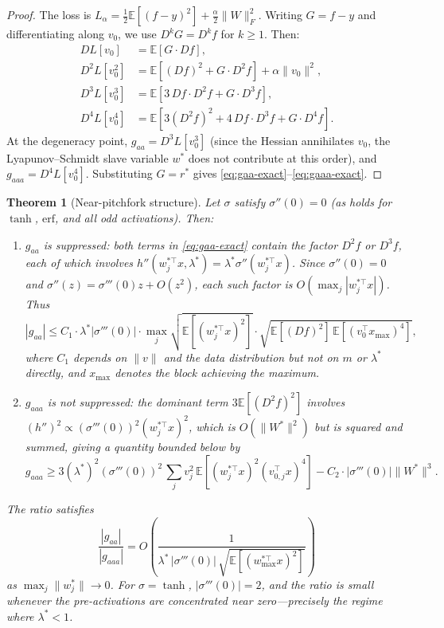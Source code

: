 \documentclass[11pt, reqno]{amsart}
\theoremstyle{plain}
\newtheorem{theorem}{Theorem}[section]
\theoremstyle{definition}
\theoremstyle{remark}
\begin{document}
\begin{proof}
The loss is $L_\alpha=\tfrac12\mathbb E[(f-y)^2]+\tfrac\alpha2\|W\|_F^2$.  Writing $G=f-y$ and differentiating along $v_0$, we use $D^k G=D^kf$ for $k\ge 1$. Then:
\begin{align}
  DL[v_0]     &=\mathbb E[G\cdot Df],\\
  D^2L[v_0^2] &=\mathbb E[(Df)^2+G\cdot D^2f]+\alpha\|v_0\|^2,\\
  D^3L[v_0^3] &=\mathbb E[3\,Df\cdot D^2f+G\cdot D^3f],\\
  D^4L[v_0^4] &=\mathbb E[3(D^2f)^2+4\,Df\cdot D^3f+G\cdot D^4f].
\end{align}
At the degeneracy point, $g_{aa}=D^3L[v_0^3]$ (since the Hessian annihilates $v_0$, the Lyapunov--Schmidt slave variable $w^*$ does not contribute at this order), and $g_{aaa}=D^4L[v_0^4]$.  Substituting $G=r^*$ gives \eqref{eq:gaa-exact}--\eqref{eq:gaaa-exact}.
\end{proof}

\begin{theorem}[Near-pitchfork structure]\label{thm:near-pitchfork-structure}
Let $\sigma$ satisfy $\sigma''(0)=0$ (as holds for $\tanh$, $\mathrm{erf}$, and all odd activations).  Then:
\begin{enumerate}[label=(\roman*)]
\item $g_{aa}$ is suppressed: both terms in \eqref{eq:gaa-exact} contain the factor $D^2f$ or $D^3f$, each of which involves $h''(w_j^{*\top}x,\lambda^*)=\lambda^*\sigma''(w_j^{*\top}x)$.  Since $\sigma''(0)=0$ and $\sigma''(z)=\sigma'''(0)z+O(z^2)$, each such factor is $O(\max_j|w_j^{*\top}x|)$. Thus
\begin{equation}\label{eq:gaa-suppression}
  |g_{aa}|\le C_1\cdot\lambda^*|\sigma'''(0)|\cdot\max_j\!\sqrt{\mathbb E[(w_j^{*\top}x)^2]}\cdot\sqrt{\mathbb E[(Df)^2]\,\mathbb E[(v_0^{\top}x_{\max})^4]},
\end{equation}
where $C_1$ depends on $\|v\|$ and the data distribution but not on $m$ or $\lambda^*$ directly, and $x_{\max}$ denotes the block achieving the maximum.

\item $g_{aaa}$ is not suppressed: the dominant term $3\mathbb E[(D^2f)^2]$ involves $(h'')^2\propto (\sigma'''(0))^2(w_j^{*\top}x)^2$, which is $O(\|W^*\|^2)$ but is squared and summed, giving a quantity bounded below by
\begin{equation}\label{eq:gaaa-lower}
  g_{aaa}\ge 3(\lambda^*)^2(\sigma'''(0))^2\,\sum_j v_j^2\,\mathbb E\!\left[(w_j^{*\top}x)^2(v_{0,j}^\top x)^4\right]-C_2\cdot|\sigma'''(0)|\|W^*\|^3.
\end{equation}
\end{enumerate}

The ratio satisfies
\begin{equation}\label{eq:ratio-explicit}
  \frac{|g_{aa}|}{|g_{aaa}|} = O\!\left(\frac{1}{\lambda^*\,|\sigma'''(0)|\,\sqrt{\mathbb E[(w_{\max}^{*\top}x)^2]}}\right)
\end{equation}
as $\max_j\|w_j^*\|\to 0$. For $\sigma=\tanh$, $|\sigma'''(0)|=2$, and the ratio is small whenever the pre-activations are concentrated near zero---precisely the regime where $\lambda^*<1$.
\end{theorem}
\end{document}
